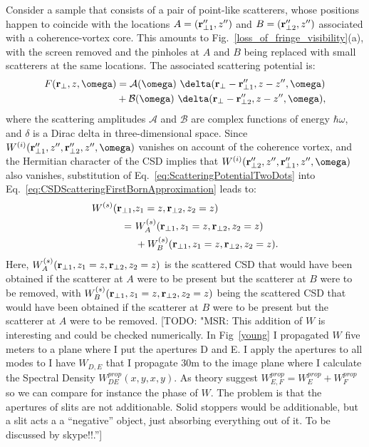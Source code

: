 \documentclass{iucr}              %
\newcommand{\todo}[1]{{\color{red}[TODO: "#1'']}}
\begin{document}
Consider a sample that consists of a pair of point-like scatterers, whose positions happen to coincide with the locations $A=({\bf r}_{\perp 1}'',z'')$ and $B=({\bf r}_{\perp 2}'',z'')$ associated with a coherence-vortex core. This amounts to Fig.~\ref{loss_of_fringe_visibility}(a), with the screen removed and the pinholes at $A$ and $B$ being replaced with small scatterers at the same locations.  The associated scattering potential is:
\begin{equation}
\begin{aligned}
F({\bf r}_{\perp},z,\omega) &= \mathcal{A}(\omega)~ \delta({\bf r}_{\perp}-{\bf r}_{\perp 1}'',z-z'',\omega) \\ &+ \mathcal{B}(\omega) ~\delta({\bf r}_{\perp}-{\bf r}_{\perp 2}'',z-z'',\omega),
\label{eq:ScatteringPotentialTwoDots}
\end{aligned}
\end{equation}
where the scattering amplitudes $\mathcal{A}$ and $\mathcal{B}$ are complex functions of energy $\hbar\omega$, and $\delta$ is a Dirac delta in three-dimensional space.   Since $W^{(i)}({\bf r}_{\perp 1}'',z'',{\bf r}_{\perp 2}'',z'',\omega)$ vanishes on account of the coherence vortex, and the Hermitian character of the CSD \cite{mandel_wolf} implies that $W^{(i)}({\bf r}_{\perp 2}'',z'',{\bf r}_{\perp 1}'',z'',\omega)$ also vanishes, substitution of Eq.~\ref{eq:ScatteringPotentialTwoDots} into Eq.~\ref{eq:CSDScatteringFirstBornApproximation} leads to:
\begin{equation}
\begin{aligned}
\label{eq:CSDsforTwoScattersAtCVCore}
W^{(s)} ({\bf r}_{\perp 1}, &z_1=z, {\bf r}_{\perp 2},z_2=z) \\ = ~ &W^{(s)}_A ({\bf r}_{\perp 1}, z_1=z,  {\bf r}_{\perp 2},z_2=z) \\ &+ W^{(s)}_B ({\bf r}_{\perp 1}, z_1=z, {\bf r}_{\perp 2},z_2=z).
\end{aligned}
\end{equation}
Here, $W^{(s)}_A ({\bf r}_{\perp 1}, z_1=z, {\bf r}_{\perp 2},z_2=z)$ is the scattered CSD that would have been obtained if the scatterer at $A$ were to be present but the scatterer at $B$ were to be removed, with $W^{(s)}_B ({\bf r}_{\perp 1}, z_1=z, {\bf r}_{\perp 2},z_2=z)$ being the scattered CSD that would have been obtained if the scatterer at $B$ were to be present but the scatterer at $A$ were to be removed.  
\todo{MSR: This addition of $W$ is interesting and could be checked numerically. In Fig~\ref{young} I propagated $W$ five meters to a plane where I put the apertures D and E. I apply the apertures to all modes to I have $W_{D,E}$ that I propagate 30m to the image plane where I calculate the Spectral Density $W_{DE}^{prop}(x,y,x,y)$. As theory suggest $W_{E,F}^{prop}=W_{E}^{prop}+W_{F}^{prop}$ so we can compare for instance the phase of $W$. The problem is that the apertures of slits are not additionable. Solid stoppers would be additionable, but a slit acts a a ``negative'' object, just absorbing everything out of it. To be discussed by skype!!.}
\end{document}
